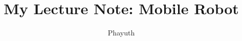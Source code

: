 \documentclass[12pt,a4paper]{book}
\begin{document}
	\title{My Lecture Note: Mobile Robot}
	\author{Phayuth}
	\maketitle
	
	\tableofcontents

	
	
	
	
\end{document}
